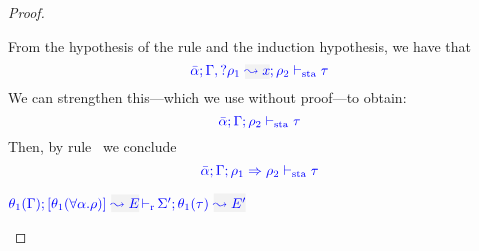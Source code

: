 \begin{proof}
\begin{description}
  From the hypothesis of the rule and the induction hypothesis, we have that
\begin{equation*}
\coherent{\bar{\alpha}}{\tenv,\envi{\rulet_1}{x}}{\rulet_2}{\type}
\end{equation*}
We can strengthen this---which we use without proof---to obtain:
\begin{equation*}
{\color{blue} \bar{\alpha}; \Gamma; \rho_2 \vdash_{\mathrm{sta}}\tau}
\end{equation*}
Then, by rule~ we conclude
\begin{equation*}
{\color{blue} \bar{\alpha}; \Gamma; \rho_1 \Rightarrow\rho_2 \vdash_{\mathrm{sta}}\tau}
\end{equation*}

\item[\fbox{\rref{M-TApp}}]\quad
$\dmres{\theta_1(\tenv)}{\theta_1(\tall{\alpha}{\rulet})}{E}{\theta_1(\type)}{E'}{\Sigma'}$\ \\


\end{description}
\end{proof}

